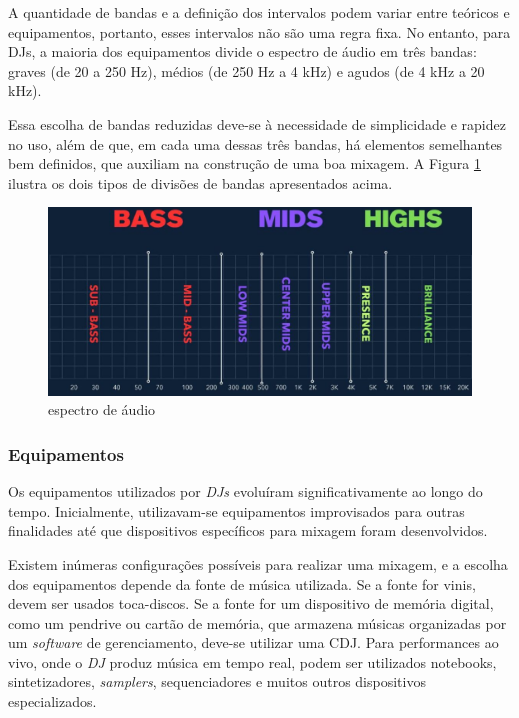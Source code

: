 A quantidade de bandas e a definição dos intervalos podem variar entre teóricos e equipamentos, portanto, esses intervalos não são uma regra fixa. No entanto, para DJs, a maioria dos equipamentos divide o espectro de áudio em três bandas: graves (de 20 a 250 Hz), médios (de 250 Hz a 4 kHz) e agudos (de 4 kHz a 20 kHz).

Essa escolha de bandas reduzidas deve-se à necessidade de simplicidade e rapidez no uso, além de que, em cada uma dessas três bandas, há elementos semelhantes bem definidos, que auxiliam na construção de uma boa mixagem. A Figura \ref{fig09} ilustra os dois tipos de divisões de bandas apresentados acima.

\begin{figure}[h]
	\centering
    \includegraphics[scale=0.4]{figuras/fig09.eps}
	\caption{espectro de áudio \cite{headphonestyAudioFrequency}}
	\label{fig09}
\end{figure}


\subsubsection{Equipamentos}

Os equipamentos utilizados por \textit{DJs} evoluíram significativamente ao longo do tempo. Inicialmente, utilizavam-se equipamentos improvisados para outras finalidades até que dispositivos específicos para mixagem foram desenvolvidos.

Existem inúmeras configurações possíveis para realizar uma mixagem, e a escolha dos equipamentos depende da fonte de música utilizada. Se a fonte for vinis, devem ser usados toca-discos. Se a fonte for um dispositivo de memória digital, como um pendrive ou cartão de memória, que armazena músicas organizadas por um \textit{software} de gerenciamento, deve-se utilizar uma CDJ. Para performances ao vivo, onde o \textit{DJ} produz música em tempo real, podem ser utilizados notebooks, sintetizadores, \textit{samplers}, sequenciadores e muitos outros dispositivos especializados.

